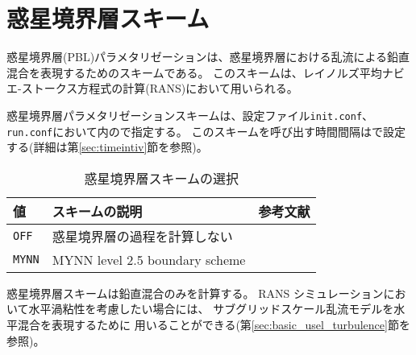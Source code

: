 
\section{惑星境界層スキーム} \label{sec:basic_usel_pbl}

惑星境界層(PBL)パラメタリゼーションは、惑星境界層における乱流による鉛直混合を表現するためのスキームである。
このスキームは、レイノルズ平均ナビエ-ストークス方程式の計算(RANS)において用いられる。

惑星境界層パラメタリゼーションスキームは、設定ファイル\verb|init.conf|、\verb|run.conf|において内ので指定する。
このスキームを呼び出す時間間隔はで設定する(詳細は第\ref{sec:timeintiv}節を参照)。

\begin{table}[h]
\begin{center}
  \caption{惑星境界層スキームの選択}
  \label{tab:nml_atm_bl}
  \begin{tabularx}{150mm}{lXX} \hline
    \rowcolor[gray]{0.9}  値 & スキームの説明 & 参考文献\\ \hline
      \verb|OFF|          & 惑星境界層の過程を計算しない &  \\
      \verb|MYNN|         & MYNN level 2.5 boundary scheme & \citet{my_1982,nakanishi_2004} \\
    \hline
  \end{tabularx}
\end{center}
\end{table}

惑星境界層スキームは鉛直混合のみを計算する。
RANS シミュレーションにおいて水平渦粘性を考慮したい場合には、
サブグリッドスケール乱流モデルを水平混合を表現するために
用いることができる(第\ref{sec:basic_usel_turbulence}節を参照)。
